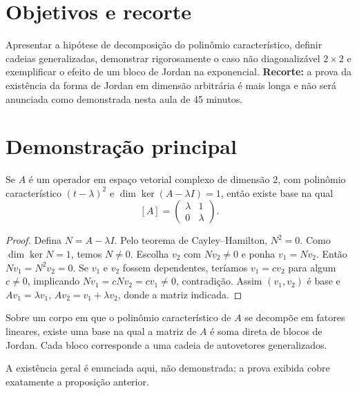 \documentclass[11pt,a4paper]{article}
\begin{document}
\section{Objetivos e recorte}
Apresentar a hipótese de decomposição do polinômio característico, definir cadeias generalizadas, demonstrar rigorosamente o caso não diagonalizável $2\times2$ e exemplificar o efeito de um bloco de Jordan na exponencial. \textbf{Recorte:} a prova da existência da forma de Jordan em dimensão arbitrária é mais longa e não será anunciada como demonstrada nesta aula de 45 minutos.
\section{Demonstração principal}
\begin{proposicao}
Se $A$ é um operador em espaço vetorial complexo de dimensão $2$, com polinômio característico $(t-\lambda)^2$ e $\dim\ker(A-\lambda I)=1$, então existe base na qual
\[
[A]=\begin{pmatrix}\lambda&1\\0&\lambda\end{pmatrix}.
\]
\end{proposicao}
\begin{proof}
Defina $N=A-\lambda I$. Pelo teorema de Cayley--Hamilton, $N^2=0$. Como $\dim\ker N=1$, temos $N\ne0$. Escolha $v_2$ com $Nv_2\ne0$ e ponha $v_1=Nv_2$. Então $Nv_1=N^2v_2=0$. Se $v_1$ e $v_2$ fossem dependentes, teríamos $v_1=cv_2$ para algum $c\ne0$, implicando $Nv_1=cNv_2=cv_1\ne0$, contradição. Assim $(v_1,v_2)$ é base e
$Av_1=\lambda v_1$, $Av_2=v_1+\lambda v_2$, donde a matriz indicada.
\end{proof}
\begin{teorema}
Sobre um corpo em que o polinômio característico de $A$ se decompõe em fatores lineares, existe uma base na qual a matriz de $A$ é soma direta de blocos de Jordan. Cada bloco corresponde a uma cadeia de autovetores generalizados.
\end{teorema}
\noindent A existência geral é enunciada aqui, não demonstrada; a prova exibida cobre exatamente a proposição anterior.
\end{document}
